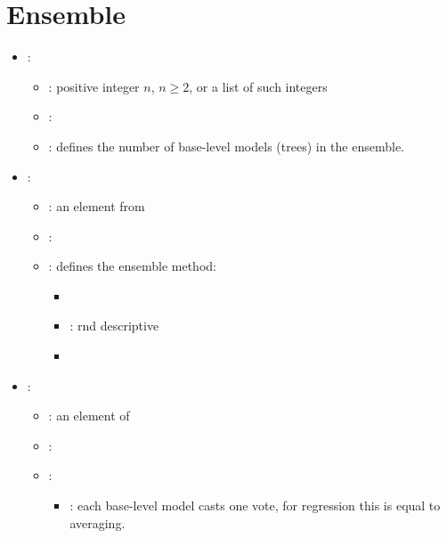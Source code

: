 \section{Ensemble}


\begin{itemize}
    \item {}:
           \begin{itemize}
                \item \optionPossibleValues{}: positive integer $n$, $n \geq 2$, or a list of such integers
                \item \optionDefaultValue{}: 
                \item \optionDescrption{}: defines the number of base-level models (trees) in the ensemble.
           \end{itemize}
    \item {}:
           \begin{itemize}
                \item \optionPossibleValues{}: an element from 
                \item \optionDefaultValue{}: 
                \item \optionDescrption{}: defines the ensemble method:
                \begin{itemize}
                    \item 
                    \item {}: rnd descriptive 
                    \item {}
                \end{itemize}
           \end{itemize}
    \item {}:
           \begin{itemize}
                \item \optionPossibleValues{}: an element of 
                \item \optionDefaultValue{}: 
                \item \optionDescrption{}:
                	\begin{itemize}
                		\item {}: each base-level model casts one vote, for regression this is equal to averaging.

\end{itemize}
\end{itemize}
\end{itemize}

